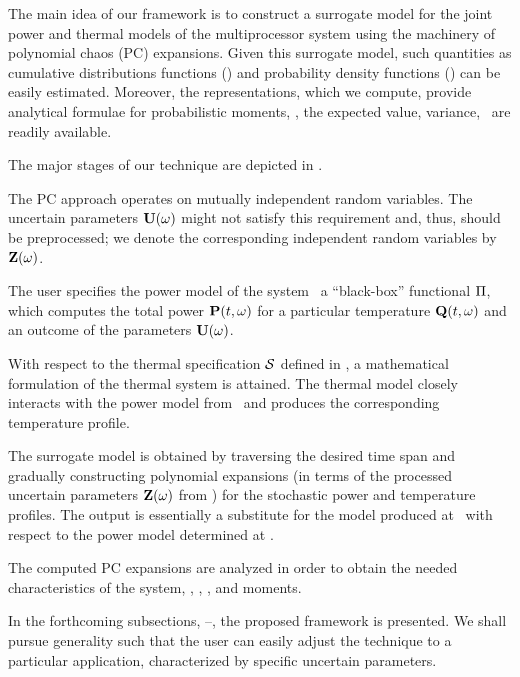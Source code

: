 The main idea of our framework is to construct a surrogate model for the joint power and thermal models of the multiprocessor system using the machinery of polynomial chaos (PC) expansions.
Given this surrogate model, such quantities as cumulative distributions functions (\cdfs) and probability density functions (\pdfs) can be easily estimated. Moreover, the representations, which we compute, provide analytical formulae for probabilistic moments, \ie, the expected value, variance, \etc\ are readily available.

The major stages of our technique are depicted in .

The PC approach operates on mutually independent random variables. The uncertain parameters $\mathbf{U}(\omega)$ might not satisfy this requirement and, thus, should be preprocessed; we denote the corresponding independent random variables by $\mathbf{Z}(\omega)$.

The user specifies the power model of the system \via\ a ``black-box'' functional $\oPower$, which computes the total power $\mathbf{P}(t, \omega)$ for a particular temperature $\mathbf{Q}(t, \omega)$ and an outcome of the parameters $\mathbf{U}(\omega)$.

With respect to the thermal specification $\mathcal{S}$ defined in , a mathematical formulation of the thermal system is attained.
The thermal model closely interacts with the power model from \ and produces the corresponding temperature profile.

The surrogate model is obtained by traversing the desired time span and gradually constructing polynomial expansions (in terms of the processed uncertain parameters $\mathbf{Z}(\omega)$ from ) for the stochastic power and temperature profiles.
The output is essentially a substitute for the model produced at \ with respect to the power model determined at .

The computed PC expansions are analyzed in order to obtain the needed characteristics of the system, \eg, \cdfs, \pdfs, and moments.

In the forthcoming subsections, --, the proposed framework is presented.
We shall pursue generality such that the user can easily adjust the technique to a particular application, characterized by specific uncertain parameters.


